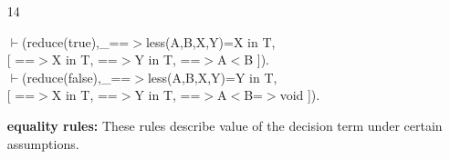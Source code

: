 \documentclass[11pt]{report}
\begin{document}
\begin{enumerate}
 {\bf membership rule:}
 The decision operator yields a value of the type $T$, provided
 both the \emph{then} and the \emph{else} part of the decision
 operator are elements of $T$.
  
 \item[14]
\begin{sf}\begin{tabbing}
$\vdash$(reduce(true),\_\hspace{0.1em}==$>$less(A,B,X,Y)=X in T, \\[-0.15ex]
\hspace{2em}[ ==$>$X in T, ==$>$Y in T, ==$>$A$<$B ]).\\[-0.15ex]
$\vdash$(reduce(false),\_\hspace{0.1em}==$>$less(A,B,X,Y)=Y in T, \\[-0.15ex]
\hspace{2em}[ ==$>$X in T, ==$>$Y in T, ==$>$A$<$B=$>$void ]).
\end{tabbing}\end{sf}

 {\bf equality rules:}      
 These rules describe value of the decision term under certain
 assumptions. 
 \end{enumerate}
 \pagebreak
\end{document}
